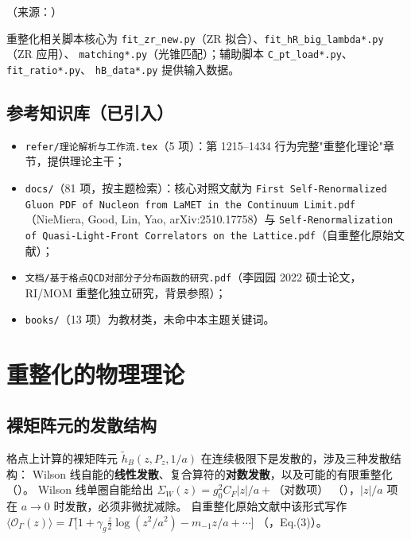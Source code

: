 \documentclass[UTF8]{ctexart}
\begin{document}
（来源：\texttt{}）

重整化相关脚本核心为 \texttt{fit\_zr\_new.py}（ZR 拟合）、\texttt{fit\_hR\_big\_lambda*.py}（ZR 应用）、
\texttt{matching*.py}（光锥匹配）；辅助脚本 \texttt{C\_pt\_load*.py}、\texttt{fit\_ratio*.py}、
\texttt{hB\_data*.py} 提供输入数据。

\subsection{参考知识库（已引入）}

\begin{itemize}
  \item \texttt{refer/理论解析与工作流.tex}（5 项）：第 1215--1434 行为完整"重整化理论"章节，提供理论主干；
  \item \texttt{docs/}（81 项，按主题检索）：核心对照文献为
        \texttt{First Self-Renormalized Gluon PDF of Nucleon from LaMET in the Continuum Limit.pdf}
        （NieMiera, Good, Lin, Yao, arXiv:2510.17758）与
        \texttt{Self-Renormalization of Quasi-Light-Front Correlators on the Lattice.pdf}（自重整化原始文献）；
  \item \texttt{文档/基于格点QCD对部分子分布函数的研究.pdf}（李园园 2022 硕士论文，RI/MOM 重整化独立研究，背景参照）；
  \item \texttt{books/}（13 项）为教材类，未命中本主题关键词。
\end{itemize}

\section{重整化的物理理论}

\subsection{裸矩阵元的发散结构}

格点上计算的裸矩阵元 $\tilde h_B(z, P_z, 1/a)$ 在连续极限下是发散的，涉及三种发散结构：
Wilson 线自能的\textbf{线性发散}、复合算符的\textbf{对数发散}，以及可能的有限重整化
（\texttt{}）。
Wilson 线单圈自能给出 $\Sigma_W(z) = g_0^2 C_F |z|/a + $（对数项）
（\texttt{}），$|z|/a$ 项在 $a\to0$ 时发散，必须非微扰减除。
自重整化原始文献中该形式写作
$\langle \mathcal O_\Gamma(z) \rangle = \Gamma\big[1 + \gamma_g \frac{z}{2}\log(z^2/a^2) - m_{-1} z/a + \cdots\big]$
（\texttt{}，Eq.(3)）。
\end{document}
